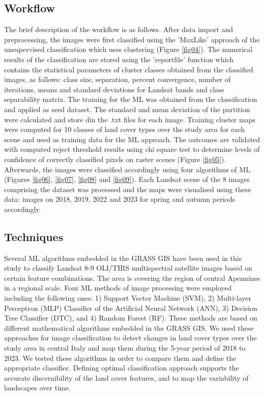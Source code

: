 \documentclass{elektr}
\begin{document}
\subsection{Workflow}
The brief description of the workflow is as follows. After data import and preprocessing, the images were first classified using the 'MaxLike' approach of the unsupervised classification which uses clustering (Figure \ref{fig04}). The numerical results of the classification are stored using the 'reportfile' function which contains the statistical parameters of cluster classes obtained from the classified images, as follows: class size, separation, percent convergence, number of iterations, means and standard deviations for Landsat bands and class separability matrix. The training for the ML was obtained from the classification and applied as seed dataset. The standard and mean deviation of the partition were calculated and store din the .txt files for each image. Training cluster maps were computed for 10 classes of land cover types over the study area for each scene and used as training data for the ML approach. The outcomes are validated with computed reject threshold results using chi square test to determine levels of confidence of correctly classified pixels on raster scenes (Figure \ref{fig05}). Afterwards, the images were classified accordingly using four algorithms of ML (Figures \ref{fig06}, \ref{fig07}, \ref{fig08} and \ref{fig09}). Each Landsat scene of the 8 images comprising the dataset was processed and the maps were visualised using these data: images on 2018, 2019, 2022 and 2023 for spring and autumn periods accordingly. 

\subsection{Techniques}

Several ML algorithms embedded in the GRASS GIS have been used in this study to classify Landsat 8-9 OLI/TIRS multispectral satellite images based on certain feature combinations. The area is covering the region of central Apennines in a regional scale. Four ML methods of image processing were employed including the following ones: 1) Support Vector Machine (SVM), 2) Multi-layer Perceptron (MLP) Classifier of the Artificial Neural Network (ANN), 3) Decision Tree Classifier (DTC), and 4) Random Forest (RF). These methods are based on different mathematical algorithms embedded in the GRASS GIS. We used these approaches for image classification to detect changes in land cover types over the study area in central Italy and map them during the 5-year period of 2018 to 2023. We tested these algorithms in order to compare them and define the appropriate classifier. Defining optimal classification approach supports the accurate discernibility of the land cover features, and to map the variability of landscapes over time.
\end{document}
